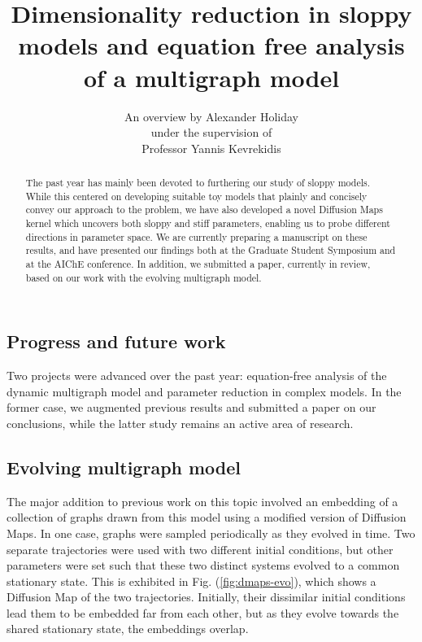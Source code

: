 \documentclass[12pt]{article}
\begin{document}
\title{\vspace{-1cm}Dimensionality reduction in sloppy models and equation free analysis of a multigraph model}
\author{\LARGE An overview by Alexander Holiday\vspace{3mm}\\\Large  under the supervision of\vspace{3mm}\\\LARGE  Professor Yannis Kevrekidis}

\maketitle
\begin{spacing}{2}
\begin{abstract}
  The past year has mainly been devoted to furthering our study of
  sloppy models. While this centered on developing suitable toy models
  that plainly and concisely convey our approach to the problem, we
  have also developed a novel Diffusion Maps kernel which uncovers
  both sloppy and stiff parameters, enabling us to probe different
  directions in parameter space. We are currently preparing a
  manuscript on these results, and have presented our findings both at
  the Graduate Student Symposium and at the AIChE conference. In
  addition, we submitted a paper, currently in review, based on our
  work with the evolving multigraph model.
\end{abstract}

\section*{Progress and future work}

\indent Two projects were advanced over the past year: equation-free
analysis of the dynamic multigraph model and parameter reduction in
complex models. In the former case, we augmented previous results and
submitted a paper on our conclusions, while the latter study remains
an active area of research.

\subsection*{Evolving multigraph model}

The major addition to previous work on this topic involved an
embedding of a collection of graphs drawn from this model using a
modified version of Diffusion Maps. In one case, graphs were sampled
periodically as they evolved in time. Two separate trajectories were
used with two different initial conditions, but other parameters were set
such that these two distinct systems evolved to a common stationary
state. This is exhibited in Fig. (\ref{fig:dmaps-evo}), which shows a
Diffusion Map of the two trajectories. Initially, their dissimilar
initial conditions lead them to be embedded far from each other, but
as they evolve towards the shared stationary state, the embeddings
overlap. \\


\end{spacing}
\end{document}
